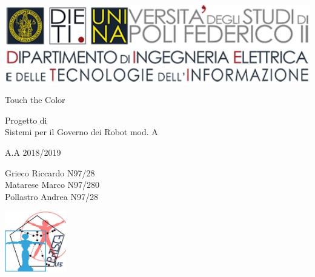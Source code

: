 
\thispagestyle{empty}

\begin{center}
	\includegraphics[width=1\textwidth]{images/DIETI}
	
	\par\bigskip
	\par\bigskip\par\bigskip\par\bigskip\par\bigskip\par\bigskip\par\bigskip\par\bigskip\par	%
	
	{\huge Touch the Color\\}
	
	\par\bigskip\par\bigskip\par\bigskip\par\bigskip\par\bigskip\par\bigskip\par	%
	
	{\LARGE Progetto di \\}
	{\LARGE Sistemi per il Governo dei Robot mod. A\\}
	{\large A.A 2018/2019\par}
	
	\par\bigskip\par\bigskip\par\bigskip\par\bigskip\par\bigskip\par\bigskip
	
	{\large Grieco Riccardo N97/28 \\}
	{\large Matarese Marco N97/280 \\}
	{\large Pollastro Andrea N97/28 \\}
	
	\par\bigskip\par\bigskip\par\bigskip\par\bigskip\par\bigskip\par\bigskip
	
	\includegraphics[width=0.2\textwidth]{images/prisca.jpg}
\end{center}
